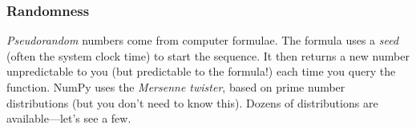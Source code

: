\documentclass[11pt]{beamer}
\begin{document}
\begin{frame}[fragile]
  \frametitle{Randomness}
  \Enlarge

  \begin{enumerate}
  \myitem  \emph{Pseudorandom} numbers come from computer formulae. %
  \myitem  The formula uses a \emph{seed} (often the system clock time) to start the sequence. %
  \myitem  It then returns a new number unpredictable to you (but predictable to the formula!) each time you query the function. %
  \myitem  NumPy uses the \emph{Mersenne twister}, based on prime number distributions (but you don't need to know this). %
  \myitem  Dozens of distributions are available---let's see a few.
  \end{enumerate}
\end{frame}


\end{document}

